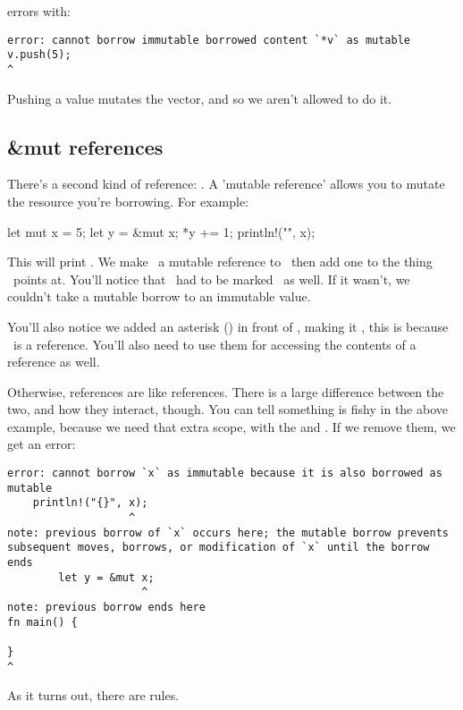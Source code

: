 errors with:

\begin{verbatim}
error: cannot borrow immutable borrowed content `*v` as mutable
v.push(5);
^
\end{verbatim}

Pushing a value mutates the vector, and so we aren't allowed to do it.

\subsection*{\&mut references}

There's a second kind of reference: . A 'mutable reference' allows you to mutate the resource you're borrowing. 
For example:

\begin{rustc}
let mut x = 5;
{
    let y = &mut x;
    *y += 1;
}
println!("{}", x);
\end{rustc}

This will print . We make \y\ a mutable reference to \x\, then add one to the thing \y\ points at. You'll 
notice that \x\ had to be marked \mut\ as well. If it wasn't, we couldn't take a mutable borrow to an immutable value.

\blank

You'll also notice we added an asterisk (\code{*}) in front of \y, making it , this is because \y\ is a 
 reference. You'll also need to use them for accessing the contents of a reference as well.

\blank

Otherwise,  references are like references. There is a large difference between the two, and how they interact, though. 
You can tell something is fishy in the above example, because we need that extra scope, with the \code{\{} and \code{\}}. If we 
remove them, we get an error:

\begin{verbatim}
error: cannot borrow `x` as immutable because it is also borrowed as mutable
    println!("{}", x);
                   ^
note: previous borrow of `x` occurs here; the mutable borrow prevents
subsequent moves, borrows, or modification of `x` until the borrow ends
        let y = &mut x;
                     ^
note: previous borrow ends here
fn main() {

}
^
\end{verbatim}

As it turns out, there are rules.

